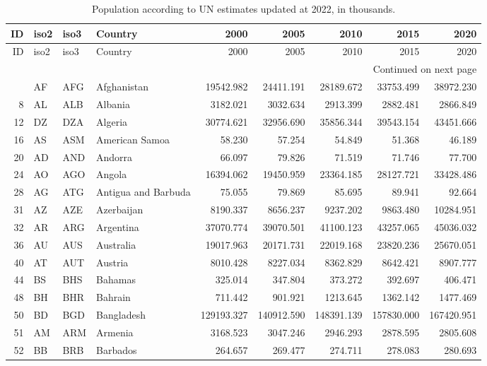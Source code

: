 {\tiny
\begin{longtable}{rlllrrrrr}
\caption{Population according to UN estimates updated at 2022, in thousands.} \label{tab:unpop} \\
\toprule
 ID & iso2 & iso3 & Country & 2000 & 2005 & 2010 & 2015 & 2020 \\
\midrule
\endfirsthead

\toprule
 ID & iso2 & iso3 & Country & 2000 & 2005 & 2010 & 2015 & 2020 \\
\midrule
\endhead
\midrule
\multicolumn{9}{r}{{Continued on next page}} \\
\midrule
\endfoot

\bottomrule
\endlastfoot
 4 & AF & AFG & Afghanistan & 19542.982 & 24411.191 & 28189.672 & 33753.499 & 38972.230 \\
 8 & AL & ALB & Albania & 3182.021 & 3032.634 & 2913.399 & 2882.481 & 2866.849 \\
 12 & DZ & DZA & Algeria & 30774.621 & 32956.690 & 35856.344 & 39543.154 & 43451.666 \\
 16 & AS & ASM & American Samoa & 58.230 & 57.254 & 54.849 & 51.368 & 46.189 \\
 20 & AD & AND & Andorra & 66.097 & 79.826 & 71.519 & 71.746 & 77.700 \\
 24 & AO & AGO & Angola & 16394.062 & 19450.959 & 23364.185 & 28127.721 & 33428.486 \\
 28 & AG & ATG & Antigua and Barbuda & 75.055 & 79.869 & 85.695 & 89.941 & 92.664 \\
 31 & AZ & AZE & Azerbaijan & 8190.337 & 8656.237 & 9237.202 & 9863.480 & 10284.951 \\
 32 & AR & ARG & Argentina & 37070.774 & 39070.501 & 41100.123 & 43257.065 & 45036.032 \\
 36 & AU & AUS & Australia & 19017.963 & 20171.731 & 22019.168 & 23820.236 & 25670.051 \\
 40 & AT & AUT & Austria & 8010.428 & 8227.034 & 8362.829 & 8642.421 & 8907.777 \\
 44 & BS & BHS & Bahamas & 325.014 & 347.804 & 373.272 & 392.697 & 406.471 \\
 48 & BH & BHR & Bahrain & 711.442 & 901.921 & 1213.645 & 1362.142 & 1477.469 \\
 50 & BD & BGD & Bangladesh & 129193.327 & 140912.590 & 148391.139 & 157830.000 & 167420.951 \\
 51 & AM & ARM & Armenia & 3168.523 & 3047.246 & 2946.293 & 2878.595 & 2805.608 \\
 52 & BB & BRB & Barbados & 264.657 & 269.477 & 274.711 & 278.083 & 280.693 \\

\end{longtable}}
